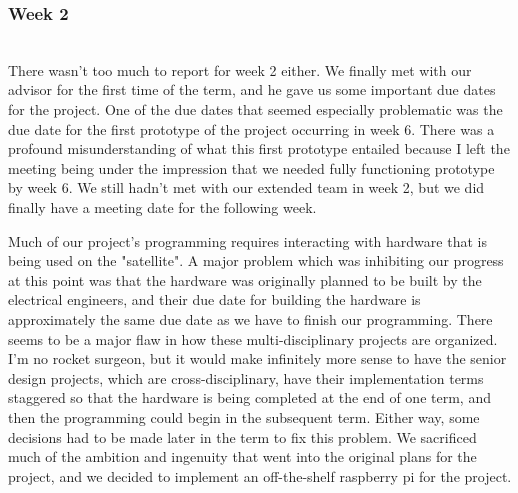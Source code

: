 \documentclass[10pt,letterpaper,onecolumn,draftclsnofoot,journal]{IEEEtran}
\begin{document}
\subsubsection{Week 2}\hspace*{\fill}\\
There wasn't too much to report for week 2 either. We finally met with our advisor for the first time of the term, and he gave us some important due dates for the project. One of the due dates that seemed especially problematic was the due date for the first prototype of the project occurring in week 6. There was a profound misunderstanding of what this first prototype entailed because I left the meeting being under the impression that we needed fully functioning prototype by week 6. We still hadn't met with our extended team in week 2, but we did finally have a meeting date for the following week.\vspace{.3cm}
\par
Much of our project's programming requires interacting with hardware that is being used on the "satellite". A major problem which was inhibiting our progress at this point was that the hardware was originally planned to be built by the electrical engineers, and their due date for building the hardware is approximately the same due date as we have to finish our programming. There seems to be a major flaw in how these multi-disciplinary projects are organized. I'm no rocket surgeon, but it would make infinitely more sense to have the senior design projects, which are cross-disciplinary, have their implementation terms staggered so that the hardware is being completed at the end of one term, and then the programming could begin in the subsequent term. Either way, some decisions had to be made later in the term to fix this problem. We sacrificed much of the ambition and ingenuity that went into the original plans for the project, and we decided to implement an off-the-shelf raspberry pi for the project.\vspace{.3cm}
\par
\end{document}
